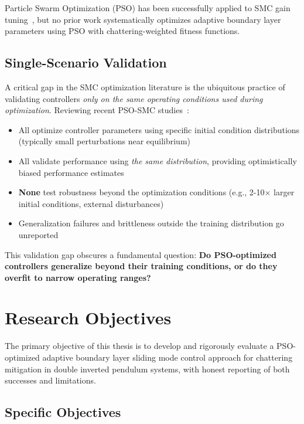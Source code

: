 \documentclass[12pt,a4paper,oneside]{report}
\begin{document}
Particle Swarm Optimization (PSO) has been successfully applied to SMC gain tuning~\cite{ayinalem2025pso, hepso2025manipulator}, but no prior work systematically optimizes adaptive boundary layer parameters using PSO with chattering-weighted fitness functions.

\subsection{Single-Scenario Validation}

A critical gap in the SMC optimization literature is the ubiquitous practice of validating controllers \emph{only on the same operating conditions used during optimization}. Reviewing recent PSO-SMC studies~\cite{ayinalem2025pso, hepso2025manipulator, mdpi2025quadcopter}:

\begin{itemize}
\item All optimize controller parameters using specific initial condition distributions (typically small perturbations near equilibrium)
\item All validate performance using \emph{the same distribution}, providing optimistically biased performance estimates
\item \textbf{None} test robustness beyond the optimization conditions (e.g., 2-10$\times$ larger initial conditions, external disturbances)
\item Generalization failures and brittleness outside the training distribution go unreported
\end{itemize}

This validation gap obscures a fundamental question: \textbf{Do PSO-optimized controllers generalize beyond their training conditions, or do they overfit to narrow operating ranges?}

\section{Research Objectives}

The primary objective of this thesis is to develop and rigorously evaluate a PSO-optimized adaptive boundary layer sliding mode control approach for chattering mitigation in double inverted pendulum systems, with honest reporting of both successes and limitations.

\subsection{Specific Objectives}
\end{document}
